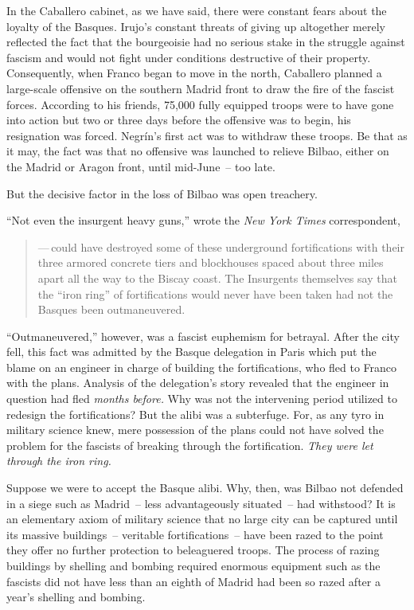In the Caballero cabinet, as we have said, there were constant fears about the loyalty of the Basques. Irujo’s constant threats of giving up altogether merely reflected the fact that the bourgeoisie had no serious stake in the struggle against fascism and would not fight under conditions destructive of their property. Consequently\kn, when Franco began to move in the north, Caballero planned a large-scale offensive on the southern Madrid front to draw the fire of the fascist forces. According to his friends, \textsc{75\kn,000} fully equipped troops were to have gone into action but two or three days before the offensive was to begin, his resignation was forced. Negr\'in’s first act was to withdraw these troops. Be that as it may\kn, the fact was that no offensive was launched to relieve Bilbao, either on the Madrid or Aragon front, until mid-June~-- too late.

\medskip

But the decisive factor in the loss of Bilbao was open treachery.

\medskip

``Not even the insurgent heavy guns,\kn'' wrote the \emph{New York Times} correspondent,

\begin{quotation}
  \noindent
  —\,could have destroyed some of these underground fortifications with their three armored concrete tiers and blockhouses spaced about three miles apart all the way to the Biscay coast. The Insurgents themselves say that the “iron ring” of fortifications would never have been taken had not the Basques been outmaneuvered.
\end{quotation}

``Outmaneuvered,\kn\kn'' however\kn, was a fascist euphemism for betrayal. After the city fell, this fact was admitted by the Basque delegation in Paris which put the blame on an engineer in charge of building the fortifications, who fled to Franco with the plans. Analysis of the delegation’s story revealed that the engineer in question had fled \emph{months before.} Why was not the intervening period utilized to redesign the fortifications? But the alibi was a subterfuge. For, as any tyro in military science knew, mere possession of the plans could not have solved the problem for the fascists of breaking through the fortification. \emph{They were let through the iron ring.}

Suppose we were to accept the Basque alibi. Why, then, was Bilbao not defended in a siege such as Madrid~-- less advantageously situated~-- had withstood? It is an elementary axiom of military science that no large city can be captured until its massive buildings~-- veritable fortifications~-- have been razed to the point they offer no further protection to beleaguered troops. The process of razing buildings by shelling and bombing required enormous equipment such as the fascists did not have less than an eighth of Madrid had been so razed after a year’s shelling and bombing.

